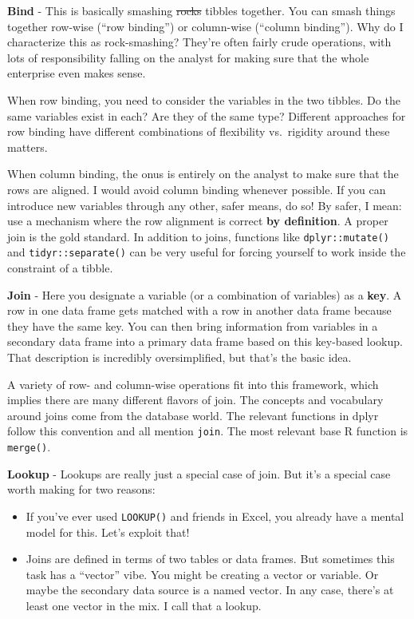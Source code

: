 \documentclass[
]{book}
\providecommand{\tightlist}{%
  \setlength{\itemsep}{0pt}\setlength{\parskip}{0pt}}
\begin{document}
\textbf{Bind} - This is basically smashing \sout{rocks} tibbles together. You can smash things together row-wise (``row binding'') or column-wise (``column binding''). Why do I characterize this as rock-smashing? They're often fairly crude operations, with lots of responsibility falling on the analyst for making sure that the whole enterprise even makes sense.

When row binding, you need to consider the variables in the two tibbles. Do the same variables exist in each? Are they of the same type? Different approaches for row binding have different combinations of flexibility vs.~rigidity around these matters.

When column binding, the onus is entirely on the analyst to make sure that the rows are aligned. I would avoid column binding whenever possible. If you can introduce new variables through any other, safer means, do so! By safer, I mean: use a mechanism where the row alignment is correct \textbf{by definition}. A proper join is the gold standard. In addition to joins, functions like \texttt{dplyr::mutate()} and \texttt{tidyr::separate()} can be very useful for forcing yourself to work inside the constraint of a tibble.

\textbf{Join} - Here you designate a variable (or a combination of variables) as a \textbf{key}. A row in one data frame gets matched with a row in another data frame because they have the same key. You can then bring information from variables in a secondary data frame into a primary data frame based on this key-based lookup. That description is incredibly oversimplified, but that's the basic idea.

A variety of row- and column-wise operations fit into this framework, which implies there are many different flavors of join. The concepts and vocabulary around joins come from the database world. The relevant functions in dplyr follow this convention and all mention \texttt{join}. The most relevant base R function is \texttt{merge()}.

\textbf{Lookup} - Lookups are really just a special case of join. But it's a special case worth making for two reasons:

\begin{itemize}
\tightlist
\item
  If you've ever used \texttt{LOOKUP()} and friends in Excel, you already have a mental model for this. Let's exploit that!
\item
  Joins are defined in terms of two tables or data frames. But sometimes this task has a ``vector'' vibe. You might be creating a vector or variable. Or maybe the secondary data source is a named vector. In any case, there's at least one vector in the mix. I call that a lookup.
\end{itemize}
\end{document}
